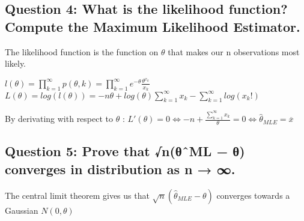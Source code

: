 \documentclass[]{article}
\begin{document}
\hypertarget{question-4-what-is-the-likelihood-function-compute-the-maximum-likelihood-estimator.}{%
\subsection{Question 4: What is the likelihood function? Compute the
Maximum Likelihood
Estimator.}\label{question-4-what-is-the-likelihood-function-compute-the-maximum-likelihood-estimator.}}

The likelihood function is the function on \(\theta\) that makes our n
observations most likely.

\(l(\theta) = \prod_{k=1}^{\infty} p(\theta,k) = \prod_{k=1}^{\infty} e^{-\theta} \frac{\theta^{x_{k}}}{x_{k}}\)
\(L(\theta) = log(l(\theta)) = -n\theta + log(\theta)\sum_{k=1}^{\infty}x_{k}-\sum_{k=1}^{\infty}log(x_{k}!)\)

By derivating with respect to \(\theta\) :
\(\begin{equation} L'(\theta) = 0 \iff -n +\frac{\sum_{k=1}^{\infty}x_{k}}{\theta} = 0 \iff \hat\theta_{MLE} \end{equation} = \overline{x}\)

\hypertarget{question-5-prove-that-nux3b8ux2c6ml-ux3b8-converges-in-distribution-as-n-.}{%
\subsection{Question 5: Prove that √n(θˆML − θ) converges in
distribution as n →
∞.}\label{question-5-prove-that-nux3b8ux2c6ml-ux3b8-converges-in-distribution-as-n-.}}

The central limit theorem gives us that
\(\sqrt{n}(\hat\theta_{MLE}-\theta)\) converges towards a Gaussian
\(N(0,\theta)\)
\end{document}
